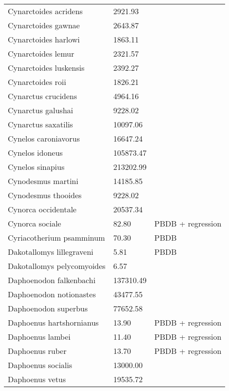 \documentclass{article}
\begin{document}
\begin{center}
\begin{longtable}{p{} p{} p{}}
    Cynarctoides acridens & 2921.93 & \cite{Tomiya2013} \\ 
    Cynarctoides gawnae & 2643.87 & \cite{Tomiya2013} \\ 
    Cynarctoides harlowi & 1863.11 & \cite{Tomiya2013} \\ 
    Cynarctoides lemur & 2321.57 & \cite{Tomiya2013} \\ 
    Cynarctoides luskensis & 2392.27 & \cite{Tomiya2013} \\ 
    Cynarctoides roii & 1826.21 & \cite{Tomiya2013} \\ 
    Cynarctus crucidens & 4964.16 & \cite{Tomiya2013} \\ 
    Cynarctus galushai & 9228.02 & \cite{Tomiya2013} \\ 
    Cynarctus saxatilis & 10097.06 & \cite{Tomiya2013} \\ 
    Cynelos caroniavorus & 16647.24 & \cite{Tomiya2013} \\ 
    Cynelos idoneus & 105873.47 & \cite{Tomiya2013} \\ 
    Cynelos sinapius & 213202.99 & \cite{Tomiya2013} \\ 
    Cynodesmus martini & 14185.85 & \cite{Tomiya2013} \\ 
    Cynodesmus thooides & 9228.02 & \cite{Tomiya2013} \\ 
    Cynorca occidentale & 20537.34 & \cite{Tomiya2013} \\ 
    Cynorca sociale & 82.80 & PBDB + regression \\ 
    Cyriacotherium psamminum & 70.30 & PBDB \\ 
    Dakotallomys lillegraveni & 5.81 & PBDB \\ 
    Dakotallomys pelycomyoides & 6.57 & \cite{Mihlbachler2006} \\ 
    Daphoenodon falkenbachi & 137310.49 & \cite{Tomiya2013} \\ 
    Daphoenodon notionastes & 43477.55 & \cite{Tomiya2013} \\ 
    Daphoenodon superbus & 77652.58 & \cite{Tomiya2013} \\ 
    Daphoenus hartshornianus & 13.90 & PBDB + regression \\ 
    Daphoenus lambei & 11.40 & PBDB + regression \\ 
    Daphoenus ruber & 13.70 & PBDB + regression \\ 
    Daphoenus socialis & 13000.00 & \cite{McKenna2011} \\ 
    Daphoenus vetus & 19535.72 & \cite{Tomiya2013} \\ 

\end{longtable}
\end{center}
\end{document}
